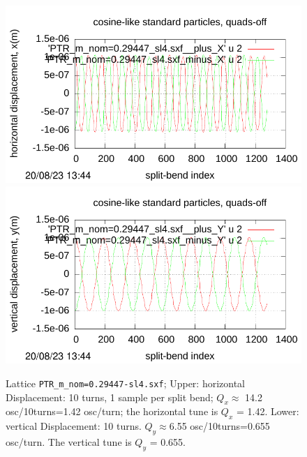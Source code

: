 \documentclass[12pt]{article}
\begin{document}
\begin{figure}[htbp]
  \includegraphics[scale=0.65]{pdf/Fig-p29-t.pdf}
  \includegraphics[scale=0.65]{pdf/Fig-p29-b.pdf} 
\caption{Lattice {\tt PTR\_m\_nom=0.29447-sl4.sxf}; Upper: horizontal Displacement: 10 turns, 
1 sample per split bend; $Q_x\approx$ 14.2 osc/10turns=1.42 osc/turn; the horizontal tune is $Q_x$ = 1.42. 
Lower: vertical Displacement: 10 turns. $Q_y\approx$6.55 osc/10turns=0.655 osc/turn. The vertical tune is $Q_y$ = 0.655.}
\end{figure}
%
%
\end{document}
